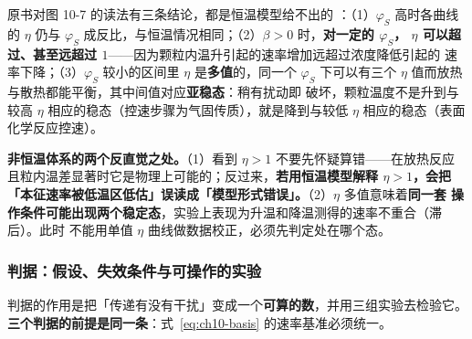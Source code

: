 原书对图 10-7 的读法有三条结论，都是恒温模型给不出的
：（1）$\varphi_S$ 高时各曲线的 $\eta$ 仍与
$\varphi_S$ 成反比，与恒温情况相同；（2）$\beta>0$ 时，\textbf{对一定的 $\varphi_S$，
$\eta$ 可以超过、甚至远超过 $1$}——因为颗粒内温升引起的速率增加远超过浓度降低引起的
速率下降；（3）$\varphi_S$ 较小的区间里 $\eta$ 是\textbf{多值}的，同一个 $\varphi_S$
下可以有三个 $\eta$ 值而放热与散热都能平衡，其中间值对应\textbf{亚稳态}：稍有扰动即
破坏，颗粒温度不是升到与较高 $\eta$ 相应的稳态（控速步骤为气固传质），就是降到与较低
$\eta$ 相应的稳态（表面化学反应控速）。

\begin{pitfall}
\textbf{非恒温体系的两个反直觉之处。}（1）看到 $\eta>1$ 不要先怀疑算错——在放热反应
且粒内温差显著时它是物理上可能的；反过来，\textbf{若用恒温模型解释 $\eta>1$，会把
「本征速率被低温区低估」误读成「模型形式错误」。}（2）$\eta$ 多值意味着\textbf{同一套
操作条件可能出现两个稳定态}，实验上表现为升温和降温测得的速率不重合（滞后）。此时
不能用单值 $\eta$ 曲线做数据校正，必须先判定处在哪个态。
\end{pitfall}

\subsubsection{判据：假设、失效条件与可操作的实验}

判据的作用是把「传递有没有干扰」变成一个\textbf{可算的数}，并用三组实验去检验它。
\textbf{三个判据的前提是同一条}：式~\eqref{eq:ch10-basis} 的速率基准必须统一。

